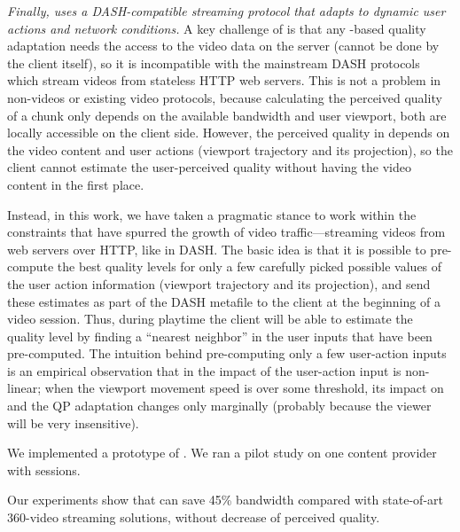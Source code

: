 \vspace{0.2cm}
{\em Finally, \name uses a DASH-compatible streaming protocol that adapts to dynamic user actions and network conditions.}
A key challenge of \vrjnd is that any \vrjnd-based quality adaptation needs the access to the video data on the server (\ie cannot be done by the client itself), so it is incompatible with the mainstream DASH protocols which stream videos from stateless HTTP web servers. 
This is not a problem in non-\vr videos or existing \vr video protocols, because calculating the perceived quality of a chunk only depends on the available bandwidth and user viewport, both are locally accessible on the client side.
However, the perceived quality in \vrjnd depends on the video content and user actions (\ie viewport trajectory and its projection), so the client cannot estimate the user-perceived quality without having the video content in the first place. 

Instead, in this work, we have taken a pragmatic stance to work within the constraints that have spurred the growth of video traffic---streaming videos from web servers over HTTP, like in DASH.
The basic idea is that it is possible to pre-compute the best quality levels for only a few carefully picked possible values of the user action information (viewport trajectory and its projection), and send these estimates as part of the DASH metafile to the client at the beginning of a video session. 
Thus, during playtime the client will be able to estimate the quality level by finding a ``nearest neighbor'' in the user inputs that have been pre-computed. 
The intuition behind pre-computing only a few user-action inputs is an empirical observation that in \vrjnd the impact of the user-action input is non-linear; \eg when the viewport movement speed is over some threshold, its impact on \vrjnd and the QP adaptation changes only marginally (probably because the viewer will be very insensitive).


\vspace{0.2cm}
We implemented a prototype of \name.
We ran a pilot study on one content provider with \fillme sessions. 

Our experiments show that \name can save 45\% bandwidth compared with state-of-art 360-video streaming solutions, without decrease of perceived quality.

